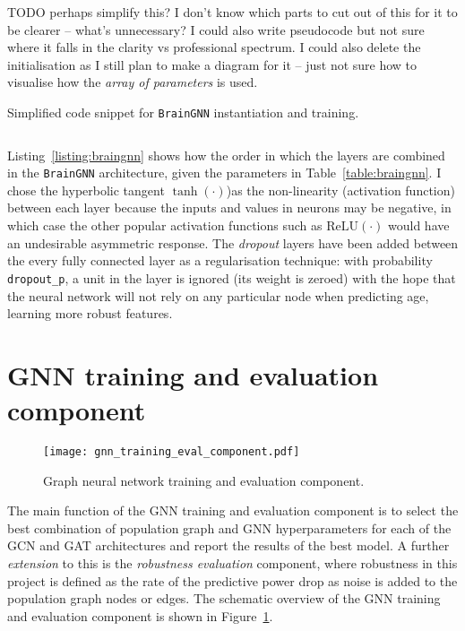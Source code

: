 TODO perhaps simplify this? I don't know which parts to cut out of this for it to be clearer – what's unnecessary? I could also write pseudocode but not sure where it falls in the clarity vs professional spectrum. I could also delete the initialisation as I still plan to make a diagram for it – just not sure how to visualise how the \textit{array of parameters} is used.

\bigskip
\begin{code}
\caption{Simplified code snippet for \texttt{BrainGNN} instantiation and training.}
\label{listing:braingnn}
\medskip
\inputminted[frame=bottomline, linenos, breaklines=true, numberblanklines=false, style=colorful]{python}{code/brain_gnn_snippet.py}
\end{code}

Listing~\ref{listing:braingnn} shows how the order in which the layers are combined in the \texttt{BrainGNN} architecture, given the parameters in Table~\ref{table:braingnn}. I chose the hyperbolic tangent $\tanh(\cdot)$)as the non-linearity (activation function) between each layer because the inputs and values in neurons may be negative, in which case the other popular activation functions such as $\mathrm{ReLU}(\cdot)$ would have an undesirable asymmetric response. The \textit{dropout} layers have been added between the every fully connected layer as a regularisation technique: with probability \texttt{dropout\_p}, a unit in the layer is ignored (its weight is zeroed) with the hope that the neural network will not rely on any particular node when predicting age, learning more robust features.


\section{GNN training and evaluation component}

\begin{figure}[]
    \centering
    \texttt{[image: gnn\_training\_eval\_component.pdf]}
    \caption{Graph neural network training and evaluation component.}\label{gnn-training-eval-component}
\end{figure}

The main function of the GNN training and evaluation component is to select the best combination of population graph and GNN hyperparameters for each of the GCN and GAT architectures and report the results of the best model. A further \textit{extension} to this is the \textit{robustness evaluation} component, where robustness in this project is defined as the rate of the predictive power drop as noise is added to the population graph nodes or edges. The schematic overview of the GNN training and evaluation component is shown in Figure~\ref{gnn-training-eval-component}.


